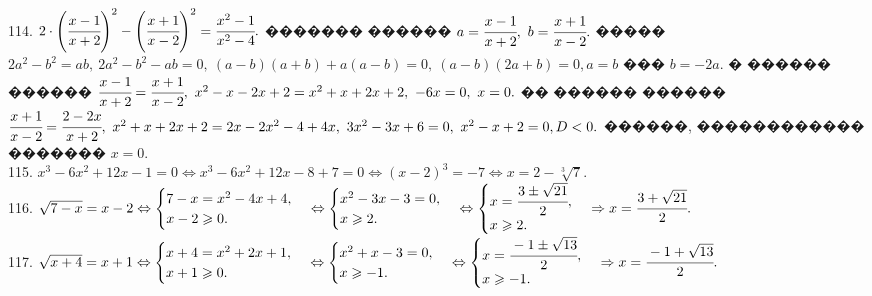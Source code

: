 \documentclass[12pt]{article}
\begin{document}
114. $2\cdot\left(\cfrac{x-1}{x+2}\right)^2-\left(\cfrac{x+1}{x-2}\right)^2=\cfrac{x^2-1}{x^2-4}.$ ������� ������ $a=\cfrac{x-1}{x+2},\ b=\cfrac{x+1}{x-2}.$ ����� $2a^2-b^2=ab,\ 2a^2-b^2-ab=0,\ (a-b)(a+b)+a(a-b)=0,\ (a-b)(2a+b)=0, a=b$ ��� $b=-2a.$ � ������ ������ $\cfrac{x-1}{x+2}=\cfrac{x+1}{x-2},\ x^2-x-2x+2=x^2+x+2x+2,\ -6x=0,\ x=0.$ �� ������ ������ $\cfrac{x+1}{x-2}=\cfrac{2-2x}{x+2},\ x^2+x+2x+2=2x-2x^2-4+4x,\ 3x^2-3x+6=0,\ x^2-x+2=0, D<0.$ ������, ������������ ������� $x=0.$\\
115. $x^3-6x^2+12x-1=0\Leftrightarrow x^3-6x^2+12x-8+7=0 \Leftrightarrow (x-2)^3=-7 \Leftrightarrow x=2-\sqrt[3]{7}.$\\
116. $\sqrt{7-x}=x-2\Leftrightarrow\begin{cases} 7-x=x^2-4x+4,\\ x-2\geqslant0.\end{cases}\Leftrightarrow\begin{cases} x^2-3x-3=0,\\ x\geqslant2.\end{cases}\Leftrightarrow\begin{cases} x=\cfrac{3\pm\sqrt{21}}{2},\\ x\geqslant2.\end{cases}\Rightarrow x=\cfrac{3+\sqrt{21}}{2}.$\\
117. $\sqrt{x+4}=x+1\Leftrightarrow\begin{cases} x+4=x^2+2x+1,\\ x+1\geqslant0.\end{cases}\Leftrightarrow\begin{cases} x^2+x-3=0,\\ x\geqslant-1.\end{cases}\Leftrightarrow\begin{cases} x=\cfrac{-1\pm\sqrt{13}}{2},\\ x\geqslant-1.\end{cases}\Rightarrow x=\cfrac{-1+\sqrt{13}}{2}.$\\
\end{document}
